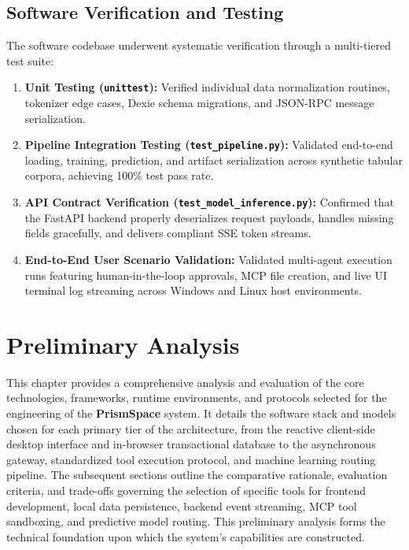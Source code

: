 \documentclass[12pt,a4paper]{report}
\begin{document}
\section{Software Verification and Testing}
The software codebase underwent systematic verification through a multi-tiered test suite:
\begin{enumerate}
    \item \textbf{Unit Testing (\texttt{unittest}):} Verified individual data normalization routines, tokenizer edge cases, Dexie schema migrations, and JSON-RPC message serialization.
    \item \textbf{Pipeline Integration Testing (\texttt{test\_pipeline.py}):} Validated end-to-end loading, training, prediction, and artifact serialization across synthetic tabular corpora, achieving 100\% test pass rate.
    \item \textbf{API Contract Verification (\texttt{test\_model\_inference.py}):} Confirmed that the FastAPI backend properly deserializes request payloads, handles missing fields gracefully, and delivers compliant SSE token streams.
    \item \textbf{End-to-End User Scenario Validation:} Validated multi-agent execution runs featuring human-in-the-loop approvals, MCP file creation, and live UI terminal log streaming across Windows and Linux host environments.
\end{enumerate}


\chapter{Preliminary Analysis}

This chapter provides a comprehensive analysis and evaluation of the core technologies, frameworks, runtime environments, and protocols selected for the engineering of the \textbf{PrismSpace} system. It details the software stack and models chosen for each primary tier of the architecture, from the reactive client-side desktop interface and in-browser transactional database to the asynchronous gateway, standardized tool execution protocol, and machine learning routing pipeline. The subsequent sections outline the comparative rationale, evaluation criteria, and trade-offs governing the selection of specific tools for frontend development, local data persistence, backend event streaming, MCP tool sandboxing, and predictive model routing. This preliminary analysis forms the technical foundation upon which the system's capabilities are constructed.
\end{document}
